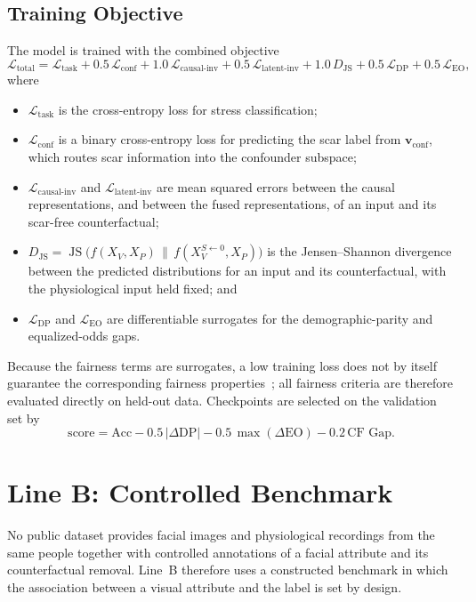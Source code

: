 \subsection{Training Objective}
\label{sec:loss}
The model is trained with the combined objective
\begin{equation}
\mathcal{L}_{\text{total}} = \mathcal{L}_{\text{task}} + 0.5\,\mathcal{L}_{\text{conf}} + 1.0\,\mathcal{L}_{\text{causal-inv}} + 0.5\,\mathcal{L}_{\text{latent-inv}} + 1.0\,D_{\text{JS}} + 0.5\,\mathcal{L}_{\text{DP}} + 0.5\,\mathcal{L}_{\text{EO}},
\end{equation}
where
\begin{itemize}
    \item $\mathcal{L}_{\text{task}}$ is the cross-entropy loss for stress classification;
    \item $\mathcal{L}_{\text{conf}}$ is a binary cross-entropy loss for predicting the scar label from $\mathbf{v}_{\text{conf}}$, which routes scar information into the confounder subspace;
    \item $\mathcal{L}_{\text{causal-inv}}$ and $\mathcal{L}_{\text{latent-inv}}$ are mean squared errors between the causal representations, and between the fused representations, of an input and its scar-free counterfactual;
    \item $D_{\text{JS}} = \operatorname{JS}\bigl(f(X_V, X_P) \,\|\, f(X_V^{S \leftarrow 0}, X_P)\bigr)$ is the Jensen--Shannon divergence between the predicted distributions for an input and its counterfactual, with the physiological input held fixed; and
    \item $\mathcal{L}_{\text{DP}}$ and $\mathcal{L}_{\text{EO}}$ are differentiable surrogates for the demographic-parity and equalized-odds gaps.
\end{itemize}
Because the fairness terms are surrogates, a low training loss does not by itself guarantee the corresponding fairness properties~\cite{yao2024}; all fairness criteria are therefore evaluated directly on held-out data. Checkpoints are selected on the validation set by
\begin{equation}
\text{score} = \text{Acc} - 0.5\,|\Delta\text{DP}| - 0.5\,\max(\Delta\text{EO}) - 0.2\,\text{CF Gap}.
\end{equation}

\section{Line B: Controlled Benchmark}
\label{sec:lineB_data}
No public dataset provides facial images and physiological recordings from the same people together with controlled annotations of a facial attribute and its counterfactual removal. Line~B therefore uses a constructed benchmark in which the association between a visual attribute and the label is set by design.

